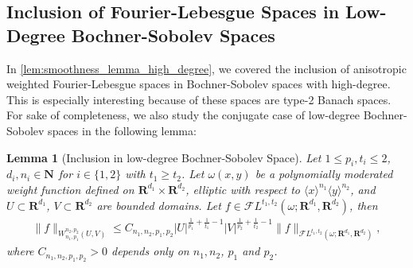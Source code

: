 \documentclass[a4paper]{article}
\newcommand{\nn}[1]{\mathbf{N}^{#1}}
\newcommand{\rr}[1]{\mathbf{R}^{#1}}
\newcommand{\rrI}{\rr{d_1}}
\newcommand{\rrII}{\rr{d_2}}
\newcommand{\rrIxII}{\rrI\times\rrII}
\newcommand{\eabs}[1]{\langle #1\rangle}     %
\newcommand{\abs}[1]{| #1|}     %
\newcommand{\norm}[2]{\|#1\|_{#2}}
\newcommand{\F}[0]{\mathscr{F}}
\newcommand{\FL}[1]{\F L^{#1}}
\numberwithin{equation}{section}
\newtheorem{lemma}[theorem]{Lemma}
\theoremstyle{remark}
\begin{document}
\subsection{Inclusion of Fourier-Lebesgue Spaces in Low-Degree Bochner-Sobolev Spaces}
\label{subsec:ConvergenceInLowOrderBochnerSobolevNorms}
In \cref{lem:smoothness_lemma_high_degree},
we covered the inclusion of anisotropic weighted Fourier-Lebesgue spaces
in Bochner-Sobolev spaces with high-degree.
This is especially interesting because of these spaces are type-2 Banach spaces.
For sake of completeness,
we also study the conjugate case of low-degree Bochner-Sobolev spaces in the following lemma:
\begin{lemma}[Inclusion in low-degree Bochner-Sobolev Space]
\label{lem:smoothness_lemma_low_degree}
    Let $1\leq p_i,t_i\leq 2$,
    $d_i, n_i \in\nn{}$ 
    for $i\in\{1,2\}$ with $t_1\geq t_2$.
    Let $\omega(x,y)$ be a polynomially moderated weight function
    defined on $\rrIxII$, elliptic with respect to
    $\eabs{x}^{n_1}\eabs{y}^{n_2}$,
    and
    $U\subset \rrI$,
    $V\subset \rrII$ are bounded domains.
    Let 
    \(f\in \FL{t_1,t_2}(\omega; \rrI, \rrII)
    \),
    then
	\begin{align}
        \label{res:low_degree_bound}
		\norm{f}{W_{n_1,p_1}^{n_2, p_2}(U, V)}
        \leq 
        C_{n_1,n_2,p_1,p_2}
        \abs{U}^{\frac{1}{p_1}+\frac{1}{t_1}-1}
        \abs{V}^{\frac{1}{p_2}+\frac{1}{t_2}-1}
        \norm{f}{\mathscr{F}L^{t_1,t_2}(\omega;\rrI,\rrII)},
	\end{align}
    where $C_{n_1,n_2,p_1,p_2}>0$ depends only on $n_1, n_2$, $p_1$ and $p_2$.
\end{lemma}
\end{document}
